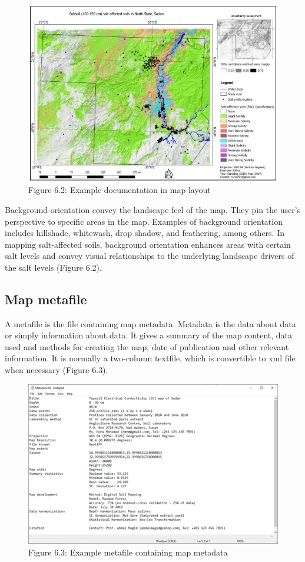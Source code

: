 \documentclass[
  10pt,
  b5paper,
]{book}
\begin{document}
\begin{figure}
\centering
\includegraphics{figures/images/Figure6.2.png}
\caption{Figure 6.2: Example documentation in map layout}
\end{figure}

Background orientation convey the landscape feel of the map. They pin the user's perspective to specific areas in the map. Examples of background orientation includes hillshade, whitewash, drop shadow, and feathering, among others. In mapping salt-affected soils, background orientation enhances areas with certain salt levels and convey visual relationships to the underlying landscape drivers of the salt levels (Figure 6.2).

\hypertarget{map-metafile}{%
\subsection{Map metafile}\label{map-metafile}}

A metafile is the file containing map metadata. Metadata is the data about data or simply information about data. It gives a summary of the map content, data used and methods for creating the map, date of publication and other relevant information. It is normally a two-column textfile, which is convertible to xml file when necessary (Figure 6.3).

\begin{figure}
\centering
\includegraphics{figures/images/Figure6.3.png}
\caption{Figure 6.3: Example metafile containing map metadata}
\end{figure}
\end{document}
